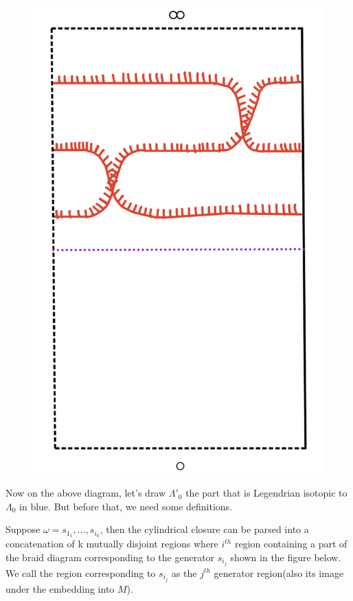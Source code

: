 \begin{figure}[H] 
    \centering
    \includegraphics[scale = 0.95]{diagrams/natural_alternating_diagrams/5.png}
    \caption{}
    \label{fig:your-label}
\end{figure}

Now on the above diagram, let's draw $\Lambda'_0$ the part that is Legendrian isotopic to $\Lambda_0$ in blue. But before that, we need some definitions.

\begin{definition}
Suppose $\omega = s_{1_1},..., s_{i_k}$, then the cylindrical closure can be parsed into a concatenation of k mutually disjoint regions where $i^{th}$ region containing a part of the braid diagram corresponding to the generator $s_{i_j}$ shown in the figure below. We call the region corresponding to $s_{i_j}$ as the $j^{th}$ generator region(also its image under the embedding into $M$).
\end{definition}

